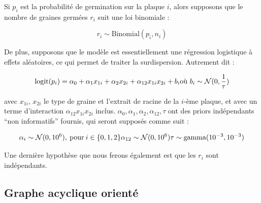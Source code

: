 \documentclass[
]{article}
\begin{document}
Si \(p_i\) est la probabilité de germination sur la plaque \(i\), alors
supposons que le nombre de graines germées \(r_i\) suit une loi
binomiale :

\[
r_i \sim \text{Binomial}(p_i,n_i)
\]

De plus, supposons que le modèle est essentiellement une régression
logistique à effets aléatoires, ce qui permet de traiter la
surdispersion. Autrement dit :

\[
  \text{logit}(p_i) = \alpha_0 + \alpha_1x_{1i} + \alpha_2x_{2i} + \alpha_{12}x_{1i}x_{2i} + b_i \\
  \text{où } b_i \sim \mathcal{N}(0,\frac{1}{\tau})
\]

avec \(x_{1i}\), \(x_{2i}\) le type de graine et l'extrait de racine de
la \(i\)-ème plaque, et avec un terme d'interaction
\(\alpha_{12}x_{1i}x_{2i}\) inclus.
\(\alpha_0, \alpha_1, \alpha_2, \alpha_{12}, \tau\) ont des priors
indépendants ``non informatifs'' fournis, qui seront supposés comme suit
:

\[
  \alpha_i \sim \mathcal{N}(0, 10^6), \: \text{pour} \: i \in \{0, 1, 2\} \\
  \alpha_{12} \sim \mathcal{N}(0, 10^6) \\
  \tau \sim \text{gamma}(10^{-3}, 10^{-3})
\]

Une dernière hypothèse que nous ferons également est que les \(r_i\)
sont indépendants.

\hypertarget{graphe-acyclique-orientuxe9}{%
\subsection{Graphe acyclique
orienté}\label{graphe-acyclique-orientuxe9}}
\end{document}
